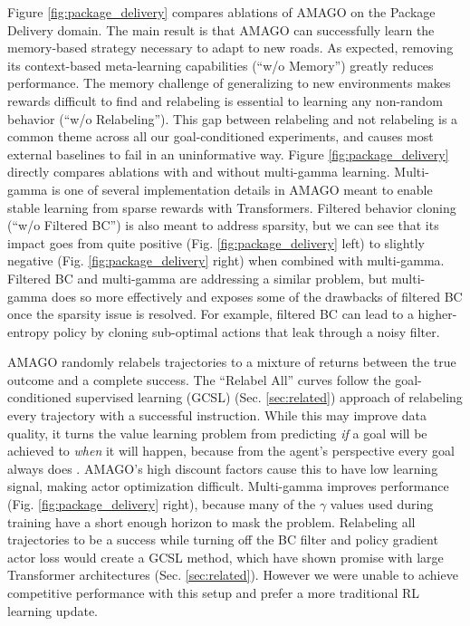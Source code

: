 Figure \ref{fig:package_delivery} compares ablations of AMAGO on the Package Delivery domain. The main result is that AMAGO can successfully learn the memory-based strategy necessary to adapt to new roads. As expected, removing its context-based meta-learning capabilities (``w/o Memory'') greatly reduces performance. The memory challenge of generalizing to new environments makes rewards difficult to find and relabeling is essential to learning any non-random behavior (``w/o Relabeling''). This gap between relabeling and not relabeling is a common theme across all our goal-conditioned experiments, and causes most external baselines to fail in an uninformative way. Figure \ref{fig:package_delivery} directly compares ablations with and without multi-gamma learning. Multi-gamma is one of several implementation details in AMAGO meant to enable stable learning from sparse rewards with Transformers. Filtered behavior cloning (``w/o Filtered BC'') \cite{wang2020critic} is also meant to address sparsity, but we can see that its impact goes from quite positive (Fig. \ref{fig:package_delivery} left) to slightly negative (Fig. \ref{fig:package_delivery} right) when combined with multi-gamma. Filtered BC and multi-gamma are addressing a similar problem, but multi-gamma does so more effectively and exposes some of the drawbacks of filtered BC once the sparsity issue is resolved. For example, filtered BC can lead to a higher-entropy policy by cloning sub-optimal actions that leak through a noisy filter.

AMAGO randomly relabels trajectories to a mixture of returns between the true outcome and a complete success. The ``Relabel All'' curves follow the goal-conditioned supervised learning (GCSL) (Sec. \ref{sec:related}) approach of relabeling every trajectory with a successful instruction. While this may improve data quality, it turns the value learning problem from predicting \textit{if} a goal will be achieved to \textit{when} it will happen, because from the agent's perspective every goal always does \cite{yang2022rethinking}. AMAGO's high discount factors cause this to have low learning signal, making actor optimization difficult. Multi-gamma improves performance (Fig. \ref{fig:package_delivery} right), because many of the $\gamma$ values used during training have a short enough horizon to mask the problem. Relabeling all trajectories to be a success while turning off the BC filter and policy gradient actor loss would create a GCSL method, which have shown promise with large Transformer architectures (Sec. \ref{sec:related}). However we were unable to achieve competitive performance with this setup and prefer a more traditional RL learning update.


